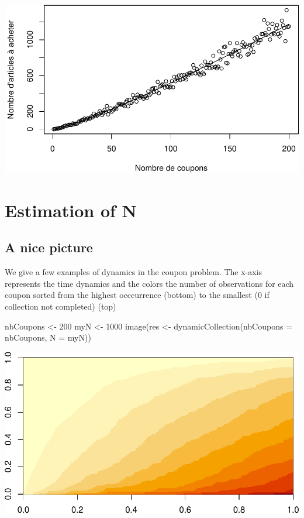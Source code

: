 \documentclass[
]{article}
\newenvironment{Shaded}{\begin{snugshade}}{\end{snugshade}}
\newcommand{\AttributeTok}[1]{\textcolor[rgb]{0.77,0.63,0.00}{#1}}
\newcommand{\DecValTok}[1]{\textcolor[rgb]{0.00,0.00,0.81}{#1}}
\newcommand{\FunctionTok}[1]{\textcolor[rgb]{0.00,0.00,0.00}{#1}}
\newcommand{\NormalTok}[1]{#1}
\newcommand{\OtherTok}[1]{\textcolor[rgb]{0.56,0.35,0.01}{#1}}
\begin{document}
\includegraphics{examples_files/figure-latex/unnamed-chunk-2-1.pdf}

\hypertarget{estimation-of-n}{%
\section{Estimation of N}\label{estimation-of-n}}

\hypertarget{a-nice-picture}{%
\subsection{A nice picture}\label{a-nice-picture}}

We give a few examples of dynamics in the coupon problem. The x-axis
represents the time dynamics and the colors the number of observations
for each coupon sorted from the highest occcurrence (bottom) to the
smallest (0 if collection not completed) (top)

\begin{Shaded}
\begin{Highlighting}[]
\NormalTok{nbCoupons }\OtherTok{\textless{}{-}} \DecValTok{200}
\NormalTok{myN }\OtherTok{\textless{}{-}} \DecValTok{1000}
\FunctionTok{image}\NormalTok{(res }\OtherTok{\textless{}{-}} \FunctionTok{dynamicCollection}\NormalTok{(}\AttributeTok{nbCoupons =}\NormalTok{ nbCoupons, }\AttributeTok{N =}\NormalTok{ myN))}
\end{Highlighting}
\end{Shaded}

\includegraphics{examples_files/figure-latex/unnamed-chunk-3-1.pdf}
\end{document}
